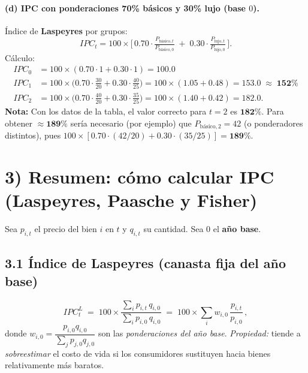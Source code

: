 \documentclass[11pt,addpoints]{article}
\begin{document}
\paragraph{(d) IPC con ponderaciones 70\% básicos y 30\% lujo (base \(0\)).} Índice de \textbf{Laspeyres} por grupos: 
\begin{equation*}
IPC_t = 100 \times \big[\,0.70 \cdot \tfrac{P_{\text{básico},t}}{P_{\text{básico},0}} \;+\; 0.30 \cdot \tfrac{P_{\text{lujo},t}}{P_{\text{lujo},0}}\,\big].
\end{equation*}
Cálculo:
\begin{align*}
IPC_0 &= 100 \times (0.70\cdot 1 + 0.30\cdot 1) = \mathbf{100.0} \\
IPC_1 &= 100 \times \big(0.70\cdot \tfrac{30}{20} + 0.30\cdot \tfrac{40}{25}\big)
      = 100 \times (1.05 + 0.48) = \mathbf{153.0} \;\approx\; \textbf{152\%} \\
IPC_2 &= 100 \times \big(0.70\cdot \tfrac{40}{20} + 0.30\cdot \tfrac{35}{25}\big)
      = 100 \times (1.40 + 0.42) = \mathbf{182.0}.
\end{align*}
\textbf{Nota:} Con los datos de la tabla, el valor correcto para \(t=2\) es \(\mathbf{182\%}\). Para obtener \(\approx \mathbf{189\%}\) sería necesario (por ejemplo) que \(P_{\text{básico},2}=42\) (o ponderadores distintos), pues \(100\times[0.70\cdot(42/20)+0.30\cdot(35/25)]=\mathbf{189\%}\).

\bigskip
\section*{3) Resumen: cómo calcular IPC (Laspeyres, Paasche y Fisher)}
Sea \(p_{i,t}\) el precio del bien \(i\) en \(t\) y \(q_{i,t}\) su cantidad. Sea \(0\) el \textbf{año base}.

\subsection*{3.1 Índice de Laspeyres (canasta fija del año base)}
\begin{equation*}
IPC_t^{L} \;=\; 100 \times \frac{\sum_i p_{i,t}\,q_{i,0}}{\sum_i p_{i,0}\,q_{i,0}}
\;=\; 100 \times \sum_i w_{i,0}\,\frac{p_{i,t}}{p_{i,0}}\,,
\end{equation*}
donde \(w_{i,0}=\dfrac{p_{i,0}q_{i,0}}{\sum_j p_{j,0}q_{j,0}}\) son las \emph{ponderaciones del año base}.
\textit{Propiedad:} tiende a \emph{sobreestimar} el costo de vida si los consumidores sustituyen hacia bienes relativamente más baratos.
\end{document}
